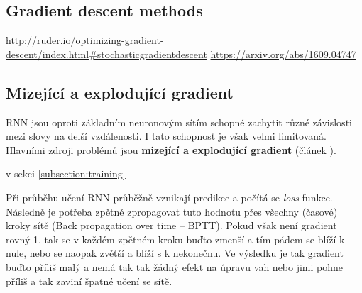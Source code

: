 \subsection{Gradient descent methods}
\url{http://ruder.io/optimizing-gradient-descent/index.html#stochasticgradientdescent}
\url{https://arxiv.org/abs/1609.04747}





\subsection{Mizející a explodující gradient} \label{subsection:gradient}
RNN jsou oproti základním neuronovým sítím schopné zachytit různé závislosti mezi slovy na delší vzdálenosti. I tato schopnost je však velmi limitovaná. Hlavními zdroji problémů jsou \textbf{mizející a explodující gradient} (článek \cite{gradientProblems}).

 v sekci \ref{subsection:training}

Při průběhu učení RNN průběžně vznikají predikce a počítá se \emph{loss}  funkce. Následně je potřeba zpětně zpropagovat tuto hodnotu přes všechny (časové) kroky sítě (Back propagation over time -- BPTT). Pokud však není gradient rovný 1, tak se v každém zpětném kroku buďto zmenší a tím pádem se blíží k nule, nebo se naopak zvětší a blíží s k nekonečnu. Ve výsledku je tak gradient buďto příliš malý a nemá tak tak žádný efekt na úpravu vah nebo jimi pohne příliš a tak zaviní špatné učení se sítě.

\begin{figure}[h]
    \begin{center}
    \end{center}
	\caption{}
	\label{img:TODO}
\end{figure}

